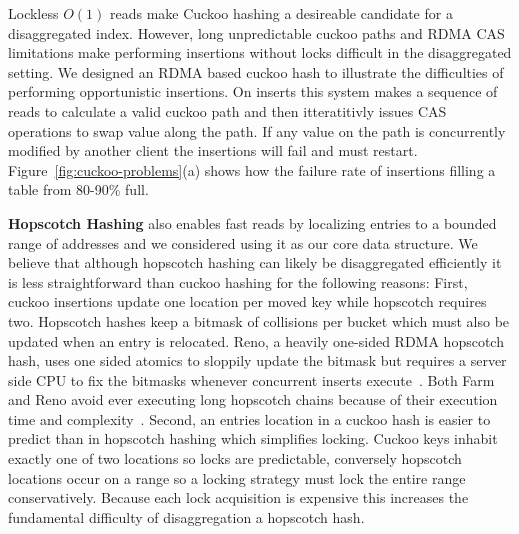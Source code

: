 
Lockless $O(1)$ reads make Cuckoo hashing a desireable
candidate for a disaggregated index. However, long
unpredictable cuckoo paths and RDMA CAS limitations make
performing insertions without locks difficult in the
disaggregated setting. We designed an RDMA based cuckoo hash
to illustrate the difficulties of performing opportunistic
insertions. On inserts this system makes a sequence of reads
to calculate a valid cuckoo path and then itteratitivly
issues CAS operations to swap value along the path. If any
value on the path is concurrently modified by another client
the insertions will fail and must restart.
Figure~\ref{fig:cuckoo-problems}(a) shows how the failure
rate of insertions filling a table from 80-90\% full.

\textbf{Hopscotch Hashing} also enables fast reads by
localizing entries to a bounded range of addresses and we
considered using it as our core data structure. We believe
that although hopscotch hashing can likely be disaggregated
efficiently it is less straightforward than cuckoo hashing
for the following reasons:
First, cuckoo insertions update one location per moved key while
hopscotch requires two. Hopscotch hashes keep a bitmask of
collisions per bucket which must also be updated when an
entry is relocated. Reno, a heavily one-sided RDMA hopscotch
hash, uses one sided atomics to sloppily update the bitmask
but requires a server side CPU to fix the bitmasks whenever
concurrent inserts execute~\cite{reno}. Both Farm and Reno
avoid ever executing long hopscotch chains because of their
execution time and complexity~\cite{farm,reno}.
Second, an entries location in a cuckoo hash is easier to
predict than in hopscotch hashing which simplifies locking.
Cuckoo keys inhabit exactly one of two locations so locks
are predictable, conversely hopscotch locations occur on a
range so a locking strategy must lock the entire range
conservatively. Because each lock acquisition is expensive
this increases the fundamental difficulty of disaggregation
a hopscotch hash.
